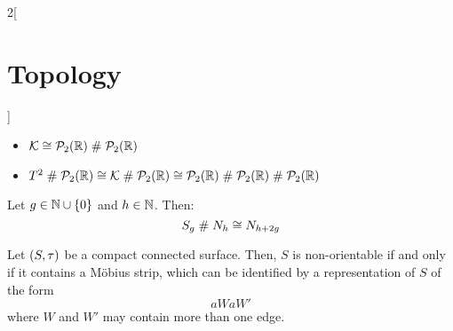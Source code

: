 \documentclass[../../../main.tex]{subfiles}
\begin{document}
\begin{multicols}{2}[\section{Topology}]
\begin{corollary}
  \end{corollary}
  \begin{prop}
    \hfill
    \begin{itemize}
      \item $\mathcal{K}\cong\mathcal{P}_2(\mathbb{R})\mathrel{\#}\mathcal{P}_2(\mathbb{R})$
      \item $T^2\mathrel{\#}\mathcal{P}_2(\mathbb{R})\cong\mathcal{K}\mathrel{\#}\mathcal{P}_2(\mathbb{R})\cong\mathcal{P}_2(\mathbb{R})\mathrel{\#}\mathcal{P}_2(\mathbb{R})\mathrel{\#}\mathcal{P}_2(\mathbb{R})$
    \end{itemize}
  \end{prop}
  \begin{corollary}
    Let $g\in\mathbb{N}\cup\{0\}$ and $h\in\mathbb{N}$. Then: $$S_g\mathrel{\#} N_h\cong N_{h+2g}$$
  \end{corollary}
  \begin{prop}
    Let $(S,\tau)$ be a compact connected surface. Then, $S$ is non-orientable if and only if it contains a Möbius strip, which can be identified by a representation of $S$ of the form $$aWaW'$$ where $W$ and $W'$ may contain more than one edge.
  \end{prop}

\end{multicols}
\end{document}
